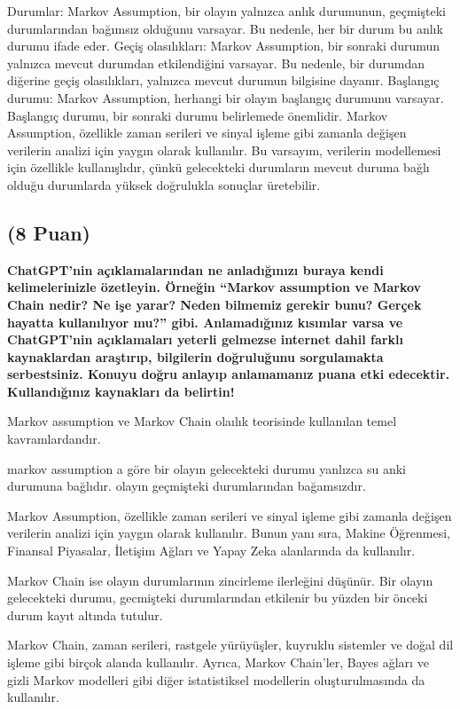 \documentclass[11pt]{article}
\begin{document}
Durumlar: Markov Assumption, bir olayın yalnızca anlık durumunun, geçmişteki durumlarından bağımsız olduğunu varsayar. Bu nedenle, her bir durum bu anlık durumu ifade eder.
Geçiş olasılıkları: Markov Assumption, bir sonraki durumun yalnızca mevcut durumdan etkilendiğini varsayar. Bu nedenle, bir durumdan diğerine geçiş olasılıkları, yalnızca mevcut durumun bilgisine dayanır.
Başlangıç durumu: Markov Assumption, herhangi bir olayın başlangıç durumunu varsayar. Başlangıç durumu, bir sonraki durumu belirlemede önemlidir.
Markov Assumption, özellikle zaman serileri ve sinyal işleme gibi zamanla değişen verilerin analizi için yaygın olarak kullanılır. Bu varsayım, verilerin modellemesi için özellikle kullanışlıdır, çünkü gelecekteki durumların mevcut duruma bağlı olduğu durumlarda yüksek doğrulukla sonuçlar üretebilir.


\subsection{(8 Puan)} \textbf{ChatGPT’nin açıklamalarından ne anladığınızı buraya kendi kelimelerinizle özetleyin. Örneğin ``Markov assumption ve Markov Chain nedir? Ne işe yarar? Neden bilmemiz gerekir bunu? Gerçek hayatta kullanılıyor mu?'' gibi. Anlamadığınız kısımlar varsa ve ChatGPT’nin açıklamaları yeterli gelmezse internet dahil farklı kaynaklardan araştırıp, bilgilerin doğruluğunu sorgulamakta serbestsiniz. Konuyu doğru anlayıp anlamamanız puana etki edecektir. Kullandığınız kaynakları da belirtin!}

Markov assumption ve Markov Chain olaılık teorisinde kullanılan temel kavramlardandır.

markov assumption a göre bir olayın gelecekteki durumu yanlızca su anki durumuna bağlıdır. olayın geçmişteki durumlarından bağamsızdır. 

Markov Assumption, özellikle zaman serileri ve sinyal işleme gibi zamanla değişen verilerin analizi için yaygın olarak kullanılır. Bunun yanı sıra, Makine Öğrenmesi, Finansal Piyasalar, İletişim Ağları ve Yapay Zeka alanlarında da kullanılır. 

Markov Chain ise olayın durumlarının zincirleme ilerleğini düşünür. Bir olayın gelecekteki durumu, gecmişteki durumlarından etkilenir bu yüzden bir önceki durum kayıt altında tutulur.

Markov Chain, zaman serileri, rastgele yürüyüşler, kuyruklu sistemler ve doğal dil işleme gibi birçok alanda kullanılır. Ayrıca, Markov Chain'ler, Bayes ağları ve gizli Markov modelleri gibi diğer istatistiksel modellerin oluşturulmasında da kullanılır.
\end{document}
